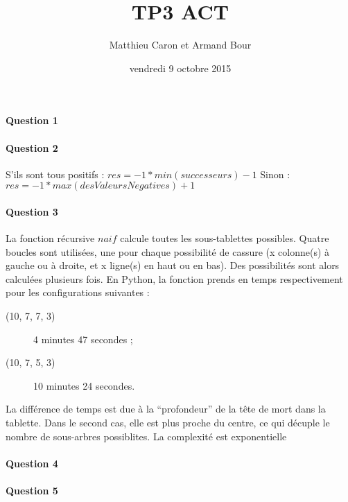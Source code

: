 \documentclass[a4paper,10pt]{article}
\title{TP3 ACT}
\author{Matthieu Caron et Armand Bour}
\date{vendredi 9 octobre 2015}
\begin{document}
\maketitle

\paragraph{Question 1}



\paragraph{Question 2}
S’ils sont tous positifs : $res = -1 * min(successeurs)-1$\newline
Sinon : $res = -1*max(desValeursNegatives) + 1$

\paragraph{Question 3}
La fonction récursive $naif$ calcule toutes les sous-tablettes possibles. Quatre boucles sont utilisées, une pour chaque possibilité de cassure (x colonne(s) à gauche ou à droite, et x ligne(s) en haut ou en bas). Des possibilités sont alors calculées plusieurs fois.\newline
En Python, la fonction prends en temps respectivement pour les configurations suivantes :
\begin{description}
\item[(10, 7, 7, 3)] 4 minutes 47 secondes ;
\item[(10, 7, 5, 3)] 10 minutes 24 secondes.
\end{description}

La différence de temps est due à la “profondeur” de la tête de mort dans la tablette. Dans le second cas, elle est plus proche du centre, ce qui décuple le nombre de sous-arbres possiblites.\newline
La complexité est exponentielle %

\paragraph{Question 4}


\paragraph{Question 5}
\end{document}
